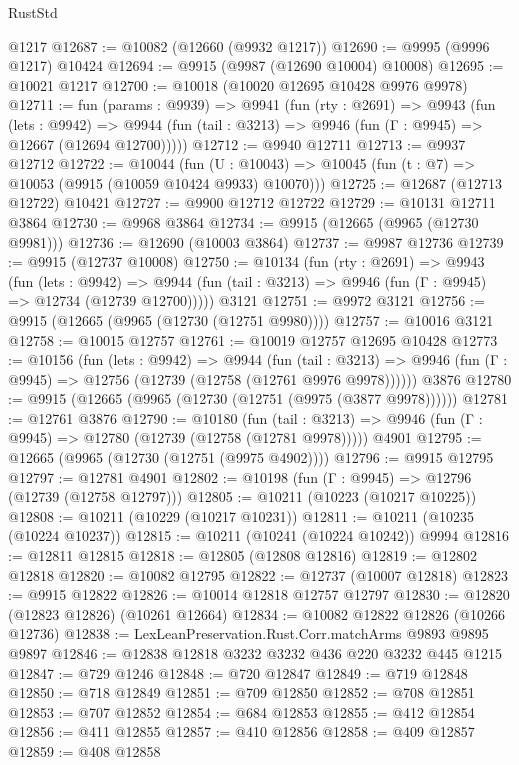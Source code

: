\begin{lexlean}{RustStd}
\begin{coremodule}
    @1217
@12687 := @10082 (@12660 (@9932 @1217))
@12690 := @9995 (@9996 @1217) @10424
@12694 := @9915 (@9987 (@12690 @10004) @10008)
@12695 := @10021 @1217
@12700 := @10018 (@10020 @12695 @10428 @9976 @9978)
@12711 := fun (params : @9939) =>
  @9941
    (fun (rty : @2691) =>
    @9943
      (fun (lets : @9942) =>
      @9944 (fun (tail : @3213) => @9946 (fun (Γ : @9945) => @12667 (@12694 @12700)))))
@12712 := @9940 @12711
@12713 := @9937 @12712
@12722 := @10044
    (fun (U : @10043) => @10045 (fun (t : @7) => @10053 (@9915 (@10059 @10424 @9933) @10070)))
@12725 := @12687 (@12713 @12722) @10421
@12727 := @9900 @12712 @12722
@12729 := @10131 @12711 @3864
@12730 := @9968 @3864
@12734 := @9915 (@12665 (@9965 (@12730 @9981)))
@12736 := @12690 (@10003 @3864)
@12737 := @9987 @12736
@12739 := @9915 (@12737 @10008)
@12750 := @10134
    (fun (rty : @2691) =>
    @9943
      (fun (lets : @9942) =>
      @9944 (fun (tail : @3213) => @9946 (fun (Γ : @9945) => @12734 (@12739 @12700)))))
    @3121
@12751 := @9972 @3121
@12756 := @9915 (@12665 (@9965 (@12730 (@12751 @9980))))
@12757 := @10016 @3121
@12758 := @10015 @12757
@12761 := @10019 @12757 @12695 @10428
@12773 := @10156
    (fun (lets : @9942) =>
    @9944
      (fun (tail : @3213) =>
      @9946 (fun (Γ : @9945) => @12756 (@12739 (@12758 (@12761 @9976 @9978))))))
    @3876
@12780 := @9915 (@12665 (@9965 (@12730 (@12751 (@9975 (@3877 @9978))))))
@12781 := @12761 @3876
@12790 := @10180
    (fun (tail : @3213) => @9946 (fun (Γ : @9945) => @12780 (@12739 (@12758 (@12781 @9978)))))
    @4901
@12795 := @12665 (@9965 (@12730 (@12751 (@9975 @4902))))
@12796 := @9915 @12795
@12797 := @12781 @4901
@12802 := @10198 (fun (Γ : @9945) => @12796 (@12739 (@12758 @12797)))
@12805 := @10211 (@10223 (@10217 @10225))
@12808 := @10211 (@10229 (@10217 @10231))
@12811 := @10211 (@10235 (@10224 @10237))
@12815 := @10211 (@10241 (@10224 @10242)) @9994
@12816 := @12811 @12815
@12818 := @12805 (@12808 @12816)
@12819 := @12802 @12818
@12820 := @10082 @12795
@12822 := @12737 (@10007 @12818)
@12823 := @9915 @12822
@12826 := @10014 @12818 @12757 @12797
@12830 := @12820 (@12823 @12826) (@10261 @12664)
@12834 := @10082 @12822 @12826 (@10266 @12736)
@12838 := LexLeanPreservation.Rust.Corr.matchArms @9893 @9895 @9897
@12846 := @12838 @12818 @3232 @3232 @436 @220 @3232 @445 @1215
@12847 := @729 @1246
@12848 := @720 @12847
@12849 := @719 @12848
@12850 := @718 @12849
@12851 := @709 @12850
@12852 := @708 @12851
@12853 := @707 @12852
@12854 := @684 @12853
@12855 := @412 @12854
@12856 := @411 @12855
@12857 := @410 @12856
@12858 := @409 @12857
@12859 := @408 @12858

\end{coremodule}
\end{lexlean}
